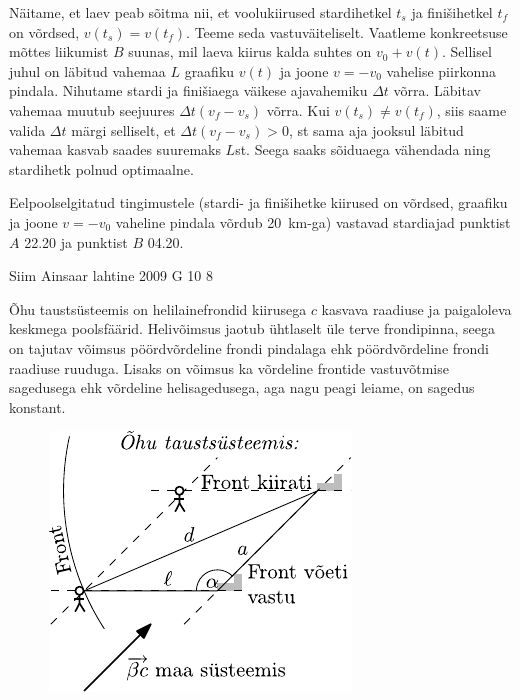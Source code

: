 \documentclass[11pt, twoside]{article}
\begin{document}
{{\ifSolution
Näitame, et laev peab sõitma nii, et voolukiirused stardihetkel $t_s$ ja finišihetkel $t_f$ on võrdsed, $v(t_s) = v(t_f)$. Teeme seda vastuväiteliselt. Vaatleme konkreetsuse mõttes liikumist $B$ suunas, mil laeva kiirus kalda suhtes on $v_0 + v(t)$. Sellisel juhul on läbitud vahemaa $L$ graafiku $v(t)$ ja joone $v = -v_0$ vahelise piirkonna pindala. Nihutame stardi ja finišiaega väikese ajavahemiku $\Delta t$ võrra. Läbitav vahemaa muutub seejuures $\Delta t(v_f - v_s)$ võrra. Kui $v(t_s) \neq v(t_f)$, siis saame valida $\Delta t$ märgi selliselt, et $\Delta t(v_f - v_s) > 0$, st sama aja jooksul läbitud vahemaa kasvab saades suuremaks $L$st. Seega saaks sõiduaega vähendada ning stardihetk polnud optimaalne.

Eelpoolselgitatud tingimustele (stardi- ja finišihetke kiirused on võrdsed, graafiku ja joone $v = -v_0$ vaheline pindala võrdub \SI{20}{km}-ga) vastavad stardiajad punktist $A$ 22.20 ja punktist $B$ 04.20.
\fi
}
\newpage

{Siim Ainsaar} %
{lahtine} %
{2009} %
{G 10} %
{8} %
{

\ifSolution
Õhu taustsüsteemis on helilainefrondid kiirusega $c$ kasvava raadiuse ja paigaloleva keskmega poolsfäärid. Helivõimsus jaotub ühtlaselt üle terve frondipinna, seega on tajutav võimsus pöördvõrdeline frondi pindalaga ehk pöördvõrdeline frondi raadiuse ruuduga. Lisaks on võimsus ka võrdeline frontide vastuvõtmise sagedusega ehk võrdeline helisagedusega, aga nagu peagi leiame, on sagedus konstant.

\begin{figure}
	\vspace{-10pt}
	\begin{center}
		\includegraphics[width = 0.9\linewidth]{2009-lahg-10-lah}
	\end{center}
\end{figure}

}}
\end{document}
